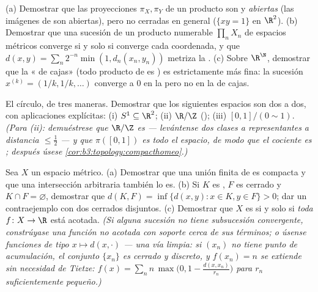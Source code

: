 \begin{exercise}[$\star\star$]\label{exo:b3:topology:4}
(a) Demostrar que las proyecciones $\pi_X, \pi_Y$ de un producto son
 y \emph{abiertas} (las
imágenes de  son abiertas), pero no cerradas en general
($\{xy = 1\}$ en $\R^2$). (b) Demostrar que una sucesión de un producto
numerable $\prod_n X_n$ de espacios métricos converge si y solo si
converge cada coordenada, y que
$d(x, y) = \sum_n 2^{-n}\min(1, d_n(x_n, y_n))$ metriza la
. (c) Sobre
$\R^\N$, demostrar que la «
de cajas» (todo producto de  es ) es estrictamente más
fina: la sucesión $x^{(k)} = (1/k, 1/k, \dots)$ converge a $0$ en la
 pero no en la
 de cajas.
\end{exercise}

\begin{exercise}[$\star\star$]\label{exo:b3:topology:5}
El círculo, de tres maneras. Demostrar que los siguientes espacios son
 dos a dos, con
aplicaciones explícitas: (i) $S^1 \subseteq \R^2$; (ii) $\R/\Z$
(); (iii)
$[0,1]/(0 \sim 1)$. \emph{(Para (ii): demuéstrese que $\R/\Z$ es
 --- levántense dos
clases a representantes a distancia $\leq \frac12$ --- y que
$\pi([0,1])$ es todo el espacio, de modo que el cociente es
; después úsese
\cref{cor:b3:topology:compacthomeo}.)}
\end{exercise}

\begin{exercise}[$\star\star$]\label{exo:b3:topology:6}
Sea $X$ un espacio métrico. (a) Demostrar que una unión finita de
 es
compacta y que una intersección
arbitraria también lo es. (b) Si $K$ es
, $F$ es cerrado y
$K \cap F = \varnothing$, demostrar que
$d(K, F) = \inf\{d(x,y) : x \in K, y \in F\} > 0$; dar un contraejemplo
con dos cerrados disjuntos. (c) Demostrar que $X$ es
 si y solo si \emph{toda} $f
\colon X \to \R$  está
acotada. \emph{(Si alguna sucesión no tiene subsucesión convergente,
constrúyase una función  no
acotada con soporte cerca de sus términos; o úsense funciones de tipo
$x \mapsto
d(x, \cdot)$ --- una vía limpia: si $(x_n)$ no tiene punto de
acumulación, el conjunto $\{x_n\}$ es cerrado y discreto, y $f(x_n) = n$
se extiende  sin
necesidad de Tietze:
$f(x) = \sum_n n\,\max\bigl(0, 1 - \frac{d(x, x_n)}{r_n}\bigr)$
para $r_n$ suficientemente pequeño.)}
\end{exercise}

